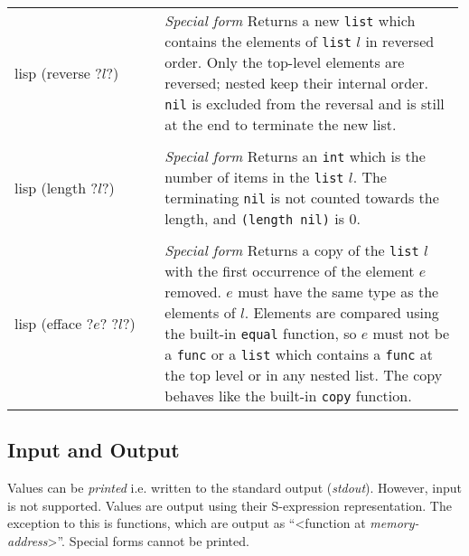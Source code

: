 \documentclass[a4paper, 12pt]{article}
\makeatletter
\newenvironment{funcdefs}
    {\begin{longtable}{@{} x{0.33\linewidth} @{} >{\raggedright\arraybackslash}p{0.66\linewidth} @{}}}
    {\end{longtable}}
\def\specialf/{\textit{Special form}\hspace{0.5em}}
\makeatother
\begin{document}
\begin{funcdefs}
\begin{minipage}[t]{\linewidth}
\begin{cminted}[autogobble=true, escapeinside=??]{lisp}
            (reverse ?$l$?)
        \end{cminted}
    \end{minipage}
    & \specialf/ Returns a new \texttt{list} which contains the elements of \texttt{list} $l$ in reversed order. Only the top-level elements are reversed; nested keep their internal order. \texttt{nil} is excluded from the reversal and is still at the end to terminate the new list.
    \\ \\
    \begin{minipage}[t]{\linewidth}
        \centering
        \begin{cminted}[autogobble=true, escapeinside=??]{lisp}
            (length ?$l$?)
        \end{cminted}
    \end{minipage}
    & \specialf/ Returns an \texttt{int} which is the number of items in the \texttt{list} $l$. The terminating \texttt{nil} is not counted towards the length, and \texttt{(length nil)} is 0.
    \\ \\
    \begin{minipage}[t]{\linewidth}
        \centering
        \begin{cminted}[autogobble=true, escapeinside=??]{lisp}
            (efface ?$e$? ?$l$?)
        \end{cminted}
    \end{minipage}
    & \specialf/ Returns a copy of the \texttt{list} $l$ with the first occurrence of the element $e$ removed. $e$ must have the same type as the elements of $l$. Elements are compared using the built-in \texttt{equal} function, so $e$ must not be a \texttt{func} or a \texttt{list} which contains a \texttt{func} at the top level or in any nested list. The copy behaves like the built-in \texttt{copy} function.
\end{funcdefs}

\subsection{Input and Output}
Values can be \textit{printed} i.e. written to the standard output (\textit{stdout}). However, input is not supported. Values are output using their S-expression representation. The exception to this is functions, which are output as ``<function at \textit{memory-address}>''. Special forms cannot be printed.
\end{document}
